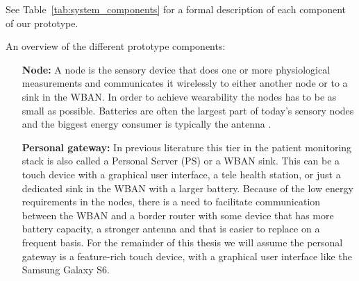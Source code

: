See Table~\ref{tab:system_components} for a formal description of each component of our prototype.


An overview of the different prototype components:
\begin{itemize}

  \item[\textbf{Node:}] A node is the sensory device that does one or more physiological measurements and communicates it wirelessly to either another node or to a sink in the WBAN. In order to achieve wearability the nodes has to be as small as possible. Batteries are often the largest part of today’s sensory nodes and the biggest energy consumer is typically the antenna \cite{Ullah:2010ci}.


  \item[\textbf{Personal gateway:}] In previous literature this tier in the patient monitoring stack is also called a Personal Server (PS) or a WBAN sink. This can be a touch device with a graphical user interface, a tele health station, or just a dedicated sink in the WBAN with a larger battery. Because of the low energy requirements in the nodes, there is a need to facilitate communication between the WBAN and a border router with some device that has more battery capacity, a stronger antenna and that is easier to replace on a frequent basis. For the remainder of this thesis we will assume the personal gateway is a feature-rich touch device, with a graphical user interface like the Samsung Galaxy S6.



\end{itemize}

